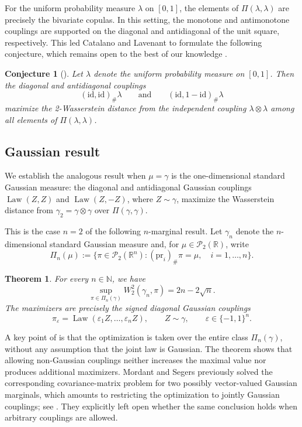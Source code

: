 \documentclass[11pt]{amsart}
\newtheorem{theorem}{Theorem}[section]
\newtheorem{conjecture}[conjecture]{Conjecture}
\theoremstyle{definition}
\newcommand{\R}{\mathbb{R}}
\newcommand{\Pcal}{\mathcal{P}}
\newcommand{\Law}{\operatorname{Law}}
\newcommand{\W}{W}
\newcommand{\Leb}{\lambda}
\begin{document}
For the uniform probability measure $\Leb$ on $[0,1]$, the elements of
$\Pi(\Leb,\Leb)$ are precisely the bivariate copulas. In this setting,
the monotone and antimonotone couplings are supported on the diagonal
and antidiagonal of the unit square, respectively. This led Catalano
and Lavenant to formulate the following conjecture, which remains open
to the best of our knowledge \cite[Remark~3]{CaLa25}.

\begin{conjecture}[{\cite[Remark~3]{CaLa25}}]
Let $\Leb$ denote the uniform probability measure on $[0,1]$. Then
the diagonal and antidiagonal couplings
\[
  (\mathrm{id},\mathrm{id})_\#\Leb
  \qquad\text{and}\qquad
  (\mathrm{id},1-\mathrm{id})_\#\Leb
\]
maximize the 2-Wasserstein distance from the independent
coupling $\Leb \otimes \Leb$ among all elements of
$\Pi(\Leb,\Leb)$.
\end{conjecture}

\subsection{Gaussian result}
We establish the analogous result when $\mu=\gamma$ is the one-dimensional standard Gaussian measure: the diagonal and antidiagonal Gaussian couplings $\Law(Z,Z)$ and $\Law(Z,-Z)$, where $Z\sim\gamma$, maximize the Wasserstein distance from $\gamma_2=\gamma\otimes\gamma$ over $\Pi(\gamma,\gamma)$.

This is the case $n=2$ of the following $n$-marginal result. Let $\gamma_n$ denote the $n$-dimensional standard Gaussian measure and, for $\mu\in\Pcal_2(\R)$, write
\[
  \Pi_n(\mu)
  :=
  \bigl\{
    \pi\in\Pcal_2(\R^n):
    (\mathrm{pr}_i)_\#\pi=\mu,\quad i=1,\ldots,n
  \bigr\}.
\]


\begin{theorem}\label{thm:gaussian-ot}
For every $n\in \mathbb N$, we have
\[
  \sup_{\pi\in\Pi_n(\gamma)}
  \W_2^2(\gamma_n,\pi)
  =2n-2\sqrt n.
\]
The maximizers are precisely the signed diagonal Gaussian couplings
\[
  \pi_\varepsilon
  =\Law(\varepsilon_1Z,\ldots,\varepsilon_nZ), \qquad Z\sim\gamma,
  \qquad
  \varepsilon\in\{-1,1\}^n.
\]

\end{theorem}

A key point of  is that the optimization is taken
over the entire class $\Pi_n(\gamma)$, without any assumption that the
joint law is Gaussian. The theorem shows that allowing non-Gaussian
couplings neither increases the maximal value nor produces additional
maximizers. Mordant and Segers previously solved the corresponding
covariance-matrix problem for two possibly vector-valued Gaussian
marginals, which amounts to restricting the optimization to jointly
Gaussian couplings; see
\cite[Proposition~3.9 and Example~3.14]{MoSe22}. They explicitly left
open whether the same conclusion holds when arbitrary couplings are
allowed.
\end{document}
